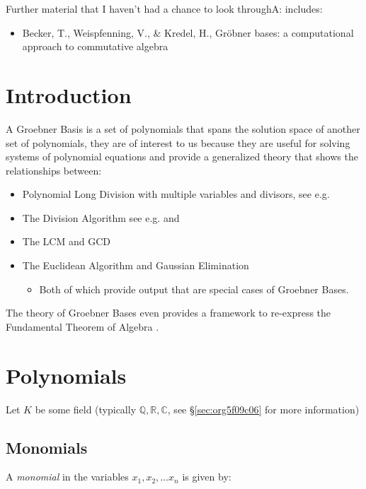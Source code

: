 \documentclass[a4paper,11pt,twoside]{article}
\begin{document}
Further material that I haven't had a chance to look throughA:
includes:

\begin{itemize}
\item Becker, T., Weispfenning, V., \& Kredel, H., Gröbner bases: a computational approach to commutative algebra \cite{beckerGrobnerBasesComputational1993}
\end{itemize}

\section{Introduction}
\label{sec:org381cde0}
A Groebner Basis is a set of polynomials that spans the solution
space of another set of polynomials, they are of interest to us
because they are useful for solving systems of polynomial equations
and provide a generalized theory that shows the relationships between: 

\begin{itemize}
\item Polynomial Long Division with multiple variables and divisors,
see e.g. \cite[\S 3]{coxIdealsVarietiesAlgorithms1997}
\item The Division Algorithm see
e.g. \cite[\S 3]{coxIdealsVarietiesAlgorithms1997} and \cite{nicodemiIntroductionAbstractAlgebra2007a}
\item The LCM and GCD \cite[\S 2.6]{coxIdealsVarietiesAlgorithms1997}
\item The Euclidean Algorithm and Gaussian Elimination
\begin{itemize}
\item Both of which provide output that are special cases of
Groebner Bases.
\end{itemize}
\end{itemize}

The theory of Groebner Bases even provides a framework to
re-express the Fundamental Theorem of Algebra
\cite{prof.berndsturmfelsIntroductionGrobnerBases2017} .

\section{Polynomials}
\label{sec:org39547bd}
Let \(K\) be some field (typically \(\mathbb{Q}, \mathbb{R},
\mathbb{C}\), see \S \ref{sec:org5f09c06} for more information)

\subsection{Monomials}
\label{sec:org6536914}
A \emph{monomial} in the variables \(x_1, x_2, \ldots x_n\) is given by: \cite[p. 3]{hibiGrobnerBasesStatistics2014}
\end{document}

